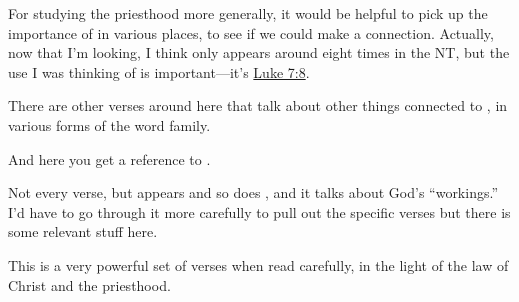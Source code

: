 \begin{compactdesc}
\begin{compactitem}
						\item For studying the priesthood more generally, it would be helpful to pick up the importance of  in various places, to see if we could make a connection. Actually, now that I'm looking, I think  only appears around eight times in the NT, but the use I was thinking of is important---it's \hyperref[LUKE-7-8]{Luke 7:8}.
					\end{compactitem}
				\item[{\hyperref[2CORINTHIANS-3-6]{2 Corinthians 3:6--11}}]
				\item[{\hyperref[2CORINTHIANS-12-9]{2 Corinthians 12:9--10}}]
				\item[{\hyperref[2CORINTHIANS-13-4]{2 Corinthians 13:4}}] \phantom{.}
					\begin{compactitem}
						\item There are other verses around here that talk about other things connected to , in various forms of the word family.
					\end{compactitem}
				\item[{\hyperref[2CORINTHIANS-13-10]{2 Corinthians 13:10}}] \phantom{.}
					\begin{compactitem}
						\item And here you get a reference to \gr{ἐξουσία}.
					\end{compactitem}
				\item[{\hyperref[GALATIANS-3-19]{Galatians 3:19}}]
				\item[{\hyperref[EPHESIANS-1-17]{Ephesians 1:17--23}}]
				\item[{\hyperref[EPHESIANS-2-18]{Ephesians 2:18}}]
				\item[{\hyperref[EPHESIANS-3]{Ephesians 3}}] \phantom{.}
					\begin{compactitem}
						\item Not every verse, but  appears and so does , and it talks about God's ``workings.'' I'd have to go through it more carefully to pull out the specific verses but there is some relevant stuff here.
					\end{compactitem}
				\item[{\hyperref[EPHESIANS-4-6]{Ephesians 4:6--16}}] \phantom{.}
					\begin{compactitem}
						\item This is a very powerful set of verses when read carefully, in the light of the law of Christ and the priesthood.
					\end{compactitem}

\end{compactdesc}

